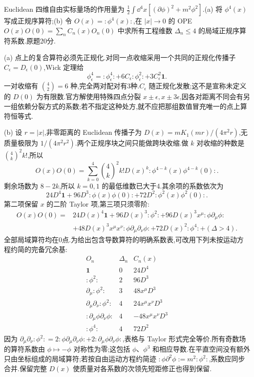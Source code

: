 \begin{exercise}
Euclidean 四维自由实标量场的作用量为 $\frac12\int\dd^4x[(\partial\phi)^2+m^2\phi^2]$.(a) 将 $\phi^4(x)$ 写成正规序算符;(b) 令 $O(x)=:\phi^4(x):$,在 $|x|\to0$ 的 OPE $O(x)O(0)=\sum_nC_n(x)O_n(0)$ 中求所有工程维数 $\Delta_n\le4$ 的局域正规序算符系数.原题20分.
\end{exercise}
\begin{solution}
(a) 点上的复合算符必须先正规化.对同一点收缩采用一个共同的正规化传播子 $C_\epsilon=D_\epsilon(0)$,Wick 定理给
\[
\phi_\epsilon^4=:\phi_\epsilon^4:
+6C_\epsilon:\phi_\epsilon^2:+3C_\epsilon^2\mathbf1.
\]
一对收缩有 $\binom42=6$ 种,完全两对配对有3种.$C_\epsilon$ 随正规化发散;这不是宣称未定义的 $D(0)$ 为有限数.官方解使用特殊四点分裂 $x\pm\epsilon,x\pm3\epsilon$,因各对距离不同会有另一组依赖分裂方式的系数;若不指定这种处方,就不应把那组数值冒充唯一的点上算符恒等式.

(b) 设 $r=|x|$,非零距离的 Euclidean 传播子为 $D(x)=mK_1(mr)/(4\pi^2r)$,无质量极限为 $1/(4\pi^2r^2)$.两个正规序块之间只能做跨块收缩.做 $k$ 对收缩的种数是 $\binom4k^2k!$,所以
\[
O(x)O(0)=\sum_{k=0}^4\binom4k^2k!D(x)^k
:\phi^{4-k}(x)\phi^{4-k}(0):.
\]
剩余场数为 $8-2k$,所以 $k=0,1$ 的最低维数已大于4.其余项的系数依次为
\[
24D^4\mathbf1+96D^3:\phi(x)\phi(0):
+72D^2:\phi^2(x)\phi^2(0):.
\]
第二项保留 $x$ 的二阶 Taylor 项,第三项只须零阶:
\begin{align*}
O(x)O(0)={}&24D(x)^4\mathbf1+96D(x)^3:\phi^2:
+96D(x)^3x^\mu:\phi\partial_\mu\phi:\\
&+48D(x)^3x^\mu x^\nu:\phi\partial_\mu\partial_\nu\phi:
+72D(x)^2:\phi^4:+(\Delta>4).
\end{align*}
全部局域算符均在0点.为给出包含导数算符的明确系数表,可改用下列未按运动方程约简的完备冗余基:
\[
\begin{array}{c|c|c}
O_n&\Delta_n&C_n(x)\\\hline
\mathbf1&0&24D^4\\
:\phi^2:&2&96D^3\\
\partial_\mu:\phi^2:&3&48x^\mu D^3\\
\partial_\mu\partial_\nu:\phi^2:&4&24x^\mu x^\nu D^3\\
:\partial_\mu\phi\partial_\nu\phi:&4&-48x^\mu x^\nu D^3\\
:\phi^4:&4&72D^2
\end{array}
\]
因为 $\partial_\mu\partial_\nu:\phi^2:
=2:\phi\partial_\mu\partial_\nu\phi:+2:\partial_\mu\phi\partial_\nu\phi:$,表格与 Taylor 形式完全等价.所有奇数场的算符系数由 $\phi\mapsto-\phi$ 对称性为零;这包括 $\phi$、$\phi^3$ 和相应导数.在平直空间没有额外只由坐标组成的局域算符;若按自由运动方程约简迹 $:\phi\partial^2\phi:=m^2:\phi^2:$,系数应同步合并.保留完整 $D(x)$ 使质量对各系数的次领先短距修正也得到保留.
\end{solution}

